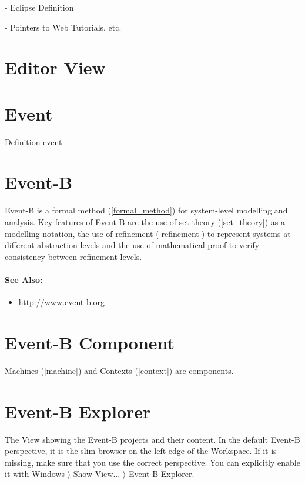 - Eclipse Definition

- Pointers to Web Tutorials, etc.

\section{Editor View}
\label{editor_view}


\section{Event}
\label{event}

Definition event

\section{Event-B}
\label{eventb}

Event-B is a formal method (\ref{formal_method}) for system-level modelling and analysis. Key features of Event-B are the use of set theory (\ref{set_theory}) as a modelling notation, the use of refinement (\ref{refinement}) to represent systems at different abstraction levels and the use of mathematical proof to verify consistency between refinement levels.

\paragraph{See Also:}
\begin{itemize}
\item \url{http://www.event-b.org}
\end{itemize}

\section{Event-B Component}
\label{eventb_component}

Machines (\ref{machine}) and Contexts (\ref{context}) are components.

\section{Event-B Explorer}
\label{eventb_explorer}

The View showing the Event-B projects and their content.  In the default Event-B perspective, it is the slim browser on the left edge of the Workspace.  If it is missing, make sure that you use the correct perspective.  You can explicitly enable it with \textsf{Windows $\rangle$ Show View... $\rangle$ Event-B Explorer}.

